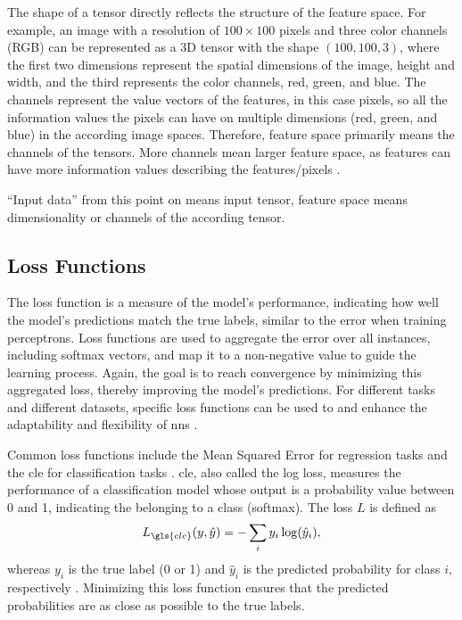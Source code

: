 The shape of a tensor directly reflects the structure of the feature space. For example, an image with a resolution of \( 100 \times 100 \) pixels and three color channels (RGB) can be represented as a 3D tensor with the shape \( (100, 100, 3) \), where the first two dimensions represent the spatial dimensions of the image, height and width, and the third represents the color channels, red, green, and blue. The channels represent the value vectors of the features, in this case pixels, so all the information values the pixels can have on multiple dimensions (red, green, and blue) in the according image spaces. Therefore, feature space primarily means the channels of the tensors. More channels mean larger feature space, as features can have more information values describing the features/pixels \autocite{Bernard2021,Bishop2006,Courtial.Touya.ea2022,Szeliski2022,Zhang.Lipton.ea2023}.

\enquote{Input data} from this point on means input tensor, feature space means dimensionality or channels of the according tensor.

\subsection{Loss Functions}
\label{subsec:loss}

The loss function is a measure of the model's performance, indicating how well the model's predictions match the true labels, similar to the error when training perceptrons. Loss functions are used to aggregate the error over all instances, including softmax vectors, and map it to a non-negative value to guide the learning process. Again, the goal is to reach convergence by minimizing this aggregated loss, thereby improving the model's predictions. For different tasks and different datasets, specific loss functions can be used to and enhance the adaptability and flexibility of \glspl{nn} \autocite{Bernard2021,Goodfellow.Bengio.ea2016,Janocha.Czarnecki2017}. 

Common loss functions include the Mean Squared Error for regression tasks and the \gls{cle} for classification tasks \autocite{Goodfellow.Bengio.ea2016,Janocha.Czarnecki2017,Szeliski2022}. \gls{cle}, also called the log loss, measures the performance of a classification model whose output is a probability value between 0 and 1, indicating the belonging to a class (softmax). The loss \( L \) is defined as
\begin{equation}
    L_{\gls{cle}}(y,\hat{y}) = -\sum_{i} y_{i} \log(\hat{y}_{i}),
\end{equation}
whereas \( y_{i} \) is the true label (0 or 1) and \( \hat{y}_{i} \) is the predicted probability for class \( i \), respectively \autocite{Zhang.Lipton.ea2023}. Minimizing this loss function ensures that the predicted probabilities are as close as possible to the true labels.

